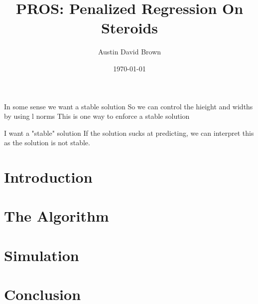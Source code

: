 \documentclass[12pt, a4paper, reqno]{amsart}
\numberwithin{equation}{section}
\begin{document}
\title{PROS: Penalized Regression On Steroids}
\author{Austin David Brown}
\date{\today}
\maketitle

\begin{abstract}
\end{abstract}


In some sense we want a stable solution
So we can control the hieight and widths by using l norms
This is one way to enforce a stable solution

I want a "stable" solution
If the solution sucks at predicting, we can interpret this as the solution is not stable.

\section{Introduction}

\section{The Algorithm}

\section{Simulation}

\section{Conclusion}
\end{document}
